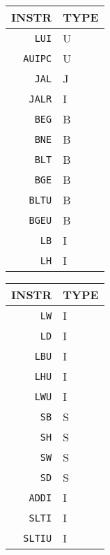 \begin{table}[!htb]
    \centering
    \begin{minipage}{.25\linewidth}
        \centering
        \begin{tabular}{r|l}
            \hline
            INSTR          & TYPE \\
            \hline
            \texttt{LUI}   & U    \\
            \texttt{AUIPC} & U    \\
            \hline
            \texttt{JAL}   & J    \\
            \texttt{JALR}  & I    \\
            \hline
            \texttt{BEG}   & B    \\
            \texttt{BNE}   & B    \\
            \texttt{BLT}   & B    \\
            \texttt{BGE}   & B    \\
            \texttt{BLTU}  & B    \\
            \texttt{BGEU}  & B    \\
            \hline
            \texttt{LB}    & I    \\
            \texttt{LH}    & I    \\

        \end{tabular}
    \end{minipage}%
    \begin{minipage}{.25\linewidth}
        \centering
        \begin{tabular}{r|l}
            \hline
            INSTR          & TYPE \\
            \hline
            \texttt{LW}    & I    \\
            \texttt{LD}    & I    \\
            \texttt{LBU}   & I    \\
            \texttt{LHU}   & I    \\
            \texttt{LWU}   & I    \\
            \hline
            \texttt{SB}    & S    \\
            \texttt{SH}    & S    \\
            \texttt{SW}    & S    \\
            \texttt{SD}    & S    \\
            \hline
            \texttt{ADDI}  & I    \\
            \texttt{SLTI}  & I    \\
            \texttt{SLTIU} & I    \\


\end{tabular}
\end{minipage}
\end{table}
